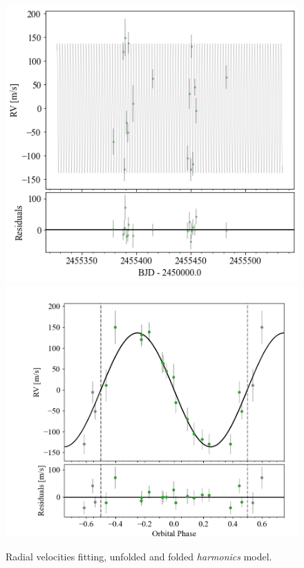 \documentclass[a4paper,11pt,twocolumn]{article}
\begin{document}
\begin{figure}[H]
	\centering
	\includegraphics[scale=0.4, angle=0]{../pictures/RV/RV2_unfolded.png}
	\includegraphics[scale=0.4, angle=0]{../pictures/RV/RV2.png}
	\caption{Radial velocities fitting, unfolded and folded \textit{harmonics} model.}
	\label{fig:RV2}
\end{figure}
\end{document}
